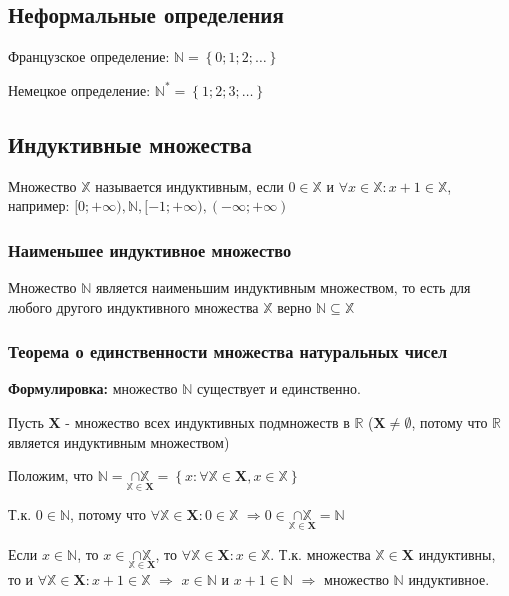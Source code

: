 \documentclass[class=article,a4paper,12pt,crop=false]{standalone}
\begin{document}
\subsection{Неформальные определения}

Французское определение: $\mathbb{N} = \left\{0; 1; 2; \dots\right\}$

Немецкое определение: $\mathbb{N}^* = \left\{1; 2; 3; \dots\right\}$

\subsection{Индуктивные множества}

Множество $\mathbb{X}$ называется индуктивным, если
$0 \in \mathbb{X}$ и $\forall x \in \mathbb{X}: x + 1 \in \mathbb{X}$,
например: $[0; +\infty), \mathbb{N}, [-1; +\infty), (-\infty; +\infty)$

\subsubsection{Наименьшее индуктивное множество}

Множество $\mathbb{N}$ является наименьшим индуктивным множеством, то
есть для любого другого индуктивного множества $\mathbb{X}$ верно 
$\mathbb{N} \subseteq \mathbb{X}$

\subsubsection{Теорема о единственности множества натуральных чисел}

\textbf{Формулировка:} множество $\mathbb{N}$ существует и единственно.

Пусть $\mathbf{X}$ - множество всех индуктивных подмножеств в $\mathbb{R}$
($\mathbf{X} \neq \emptyset$, потому что $\mathbb{R}$ является индуктивным множеством)

Положим, что $\mathbb{N} = \underset{\mathbb{X} \in \mathbf{X}}{\cap{\mathbb{X}}} =
\left\{x: \forall \mathbb{X} \in \mathbf{X}, x \in \mathbb{X}\right\}$

Т.к. $0 \in \mathbb{N}$, потому что $\forall \mathbb{X} \in \mathbf{X}: 0 \in \mathbb{X}$
$\Rightarrow 0 \in \underset{\mathbb{X} \in \mathbf{X}}{\cap{\mathbb{X}}} = \mathbb{N}$

Если $x \in \mathbb{N}$, то $x \in \underset{\mathbb{X}\in \mathbf{X}}{\cap{\mathbb{X}}}$,
то $\forall \mathbb{X} \in \mathbf{X}: x \in \mathbb{X}$. Т.к.
множества $\mathbb{X} \in \mathbf{X}$ индуктивны, то и
$\forall \mathbb{X} \in \mathbf{X}: x + 1 \in \mathbb{X}$
$\Rightarrow$ $x \in \mathbb{N}$ и $x + 1 \in \mathbb{N}$
$\Rightarrow$ множество $\mathbb{N}$ индуктивное.
\end{document}
